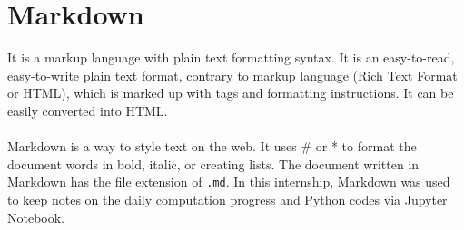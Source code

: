 \documentclass{article}
\begin{document}
{{\newpage
\section{Markdown}
It is a markup language with plain text formatting syntax. It is an easy-to-read, easy-to-write plain text format, contrary to markup language (Rich Text Format or HTML), which is marked up with tags and formatting instructions. It can be easily converted into HTML. \\
\\
Markdown is a way to style text on the web. It uses \# or * to format the document words  in bold, italic, or creating lists. 
The document written in Markdown has the file extension of \texttt{.md}. In this internship, Markdown was used to keep notes on the daily computation progress and Python codes via Jupyter Notebook. 

}}
\end{document}

